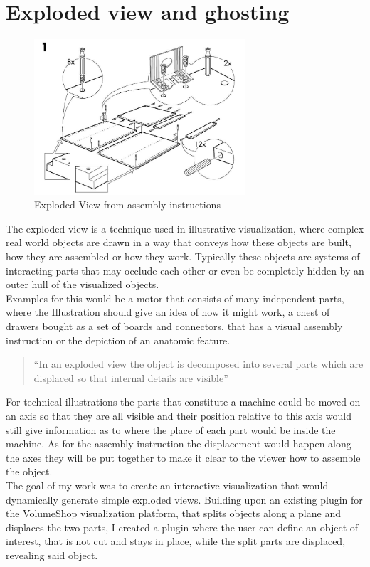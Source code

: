 \section{Exploded view and ghosting}
\begin{figure}[tb]
	\centering
	\includegraphics[width=0.7\textwidth]{chapters/figures/ikea}
	\caption{Exploded View from assembly instructions \cite{misc:ikea}}
	\label{fig:ikea}
\end{figure}
The exploded view is a technique used in illustrative visualization, where complex real world objects are drawn in a way that conveys how these objects are built, how they are assembled or how they work. Typically these objects are systems of interacting parts that may occlude each other or even be completely hidden by an outer hull of the visualized objects.\\
Examples for this would be a motor that consists of many independent parts, where the Illustration should give an idea of how it might work, a chest of drawers bought as a set of boards and connectors, that has a visual assembly instruction or the depiction of an anatomic feature.\\
\begin{quote}
``In an exploded view the object is decomposed into several parts which are displaced so that internal details are visible'' \cite{proc:bruckner-2006-EVV}
\end{quote}
For technical illustrations the parts that constitute a machine could be moved on an axis so that they are all visible and their position relative to this axis would still give information as to where the place of each part would be inside the machine. As for the assembly instruction the displacement would happen along the axes they will be put together to make it clear to the viewer how to assemble the object.\\
The goal of my work was to create an interactive visualization that would dynamically generate simple exploded views. Building upon an existing plugin for the VolumeShop visualization platform, that splits objects along a plane and displaces the two parts,  I created a plugin where the user can define an object of interest, that is not cut and stays in place, while the split parts are displaced, revealing said object.\\
